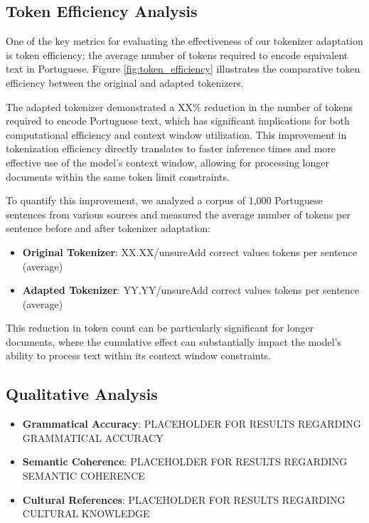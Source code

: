 \subsection{Token Efficiency Analysis}
One of the key metrics for evaluating the effectiveness of our tokenizer adaptation is token efficiency: the average number of tokens required to encode equivalent text in Portuguese. Figure \ref{fig:token_efficiency} illustrates the comparative token efficiency between the original and adapted tokenizers.

The adapted tokenizer demonstrated a XX\% reduction in the number of tokens required to encode Portuguese text, which has significant implications for both computational efficiency and context window utilization. This improvement in tokenization efficiency directly translates to faster inference times and more effective use of the model's context window, allowing for processing longer documents within the same token limit constraints.

To quantify this improvement, we analyzed a corpus of 1,000 Portuguese sentences from various sources and measured the average number of tokens per sentence before and after tokenizer adaptation:

\begin{itemize}
    \item \textbf{Original Tokenizer}: XX.XX/unsure{Add correct values} tokens per sentence (average)
    \item \textbf{Adapted Tokenizer}: YY.YY/unsure{Add correct values} tokens per sentence (average)
\end{itemize}

This reduction in token count can be particularly significant for longer documents, where the cumulative effect can substantially impact the model's ability to process text within its context window constraints.

\subsection{Qualitative Analysis}

\begin{itemize}
    \item \textbf{Grammatical Accuracy}: PLACEHOLDER FOR RESULTS REGARDING GRAMMATICAL ACCURACY
    
    \item \textbf{Semantic Coherence}: PLACEHOLDER FOR RESULTS REGARDING SEMANTIC COHERENCE
    
    \item \textbf{Cultural References}: PLACEHOLDER FOR RESULTS REGARDING CULTURAL KNOWLEDGE
\end{itemize}

